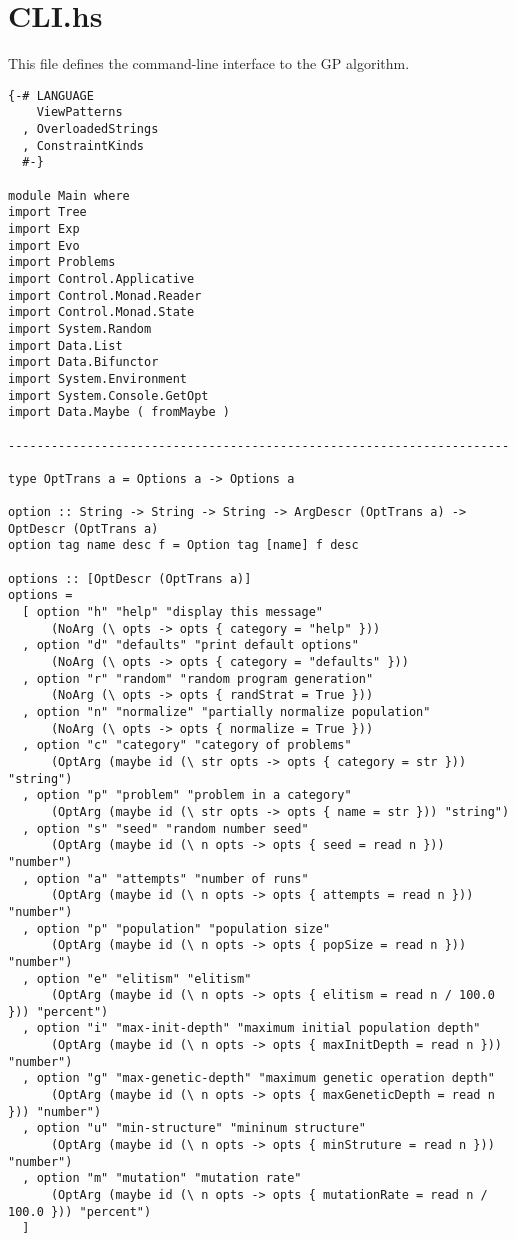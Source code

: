 \documentclass{article}
\begin{document}
\section{CLI.hs}

This file defines the command-line interface to the GP algorithm.

\begin{lstlisting}
{-# LANGUAGE
    ViewPatterns
  , OverloadedStrings
  , ConstraintKinds
  #-}

module Main where
import Tree
import Exp
import Evo
import Problems
import Control.Applicative
import Control.Monad.Reader
import Control.Monad.State
import System.Random
import Data.List
import Data.Bifunctor
import System.Environment
import System.Console.GetOpt
import Data.Maybe ( fromMaybe )

----------------------------------------------------------------------

type OptTrans a = Options a -> Options a

option :: String -> String -> String -> ArgDescr (OptTrans a) -> OptDescr (OptTrans a)
option tag name desc f = Option tag [name] f desc

options :: [OptDescr (OptTrans a)]
options =
  [ option "h" "help" "display this message"
      (NoArg (\ opts -> opts { category = "help" }))
  , option "d" "defaults" "print default options"
      (NoArg (\ opts -> opts { category = "defaults" }))
  , option "r" "random" "random program generation"
      (NoArg (\ opts -> opts { randStrat = True }))
  , option "n" "normalize" "partially normalize population"
      (NoArg (\ opts -> opts { normalize = True }))
  , option "c" "category" "category of problems"
      (OptArg (maybe id (\ str opts -> opts { category = str })) "string")
  , option "p" "problem" "problem in a category"
      (OptArg (maybe id (\ str opts -> opts { name = str })) "string")
  , option "s" "seed" "random number seed"
      (OptArg (maybe id (\ n opts -> opts { seed = read n })) "number")
  , option "a" "attempts" "number of runs"
      (OptArg (maybe id (\ n opts -> opts { attempts = read n })) "number")
  , option "p" "population" "population size"
      (OptArg (maybe id (\ n opts -> opts { popSize = read n })) "number")
  , option "e" "elitism" "elitism"
      (OptArg (maybe id (\ n opts -> opts { elitism = read n / 100.0 })) "percent")
  , option "i" "max-init-depth" "maximum initial population depth"
      (OptArg (maybe id (\ n opts -> opts { maxInitDepth = read n })) "number")
  , option "g" "max-genetic-depth" "maximum genetic operation depth"
      (OptArg (maybe id (\ n opts -> opts { maxGeneticDepth = read n })) "number")
  , option "u" "min-structure" "mininum structure"
      (OptArg (maybe id (\ n opts -> opts { minStruture = read n })) "number")
  , option "m" "mutation" "mutation rate"
      (OptArg (maybe id (\ n opts -> opts { mutationRate = read n / 100.0 })) "percent")
  ]


\end{lstlisting}
\end{document}

